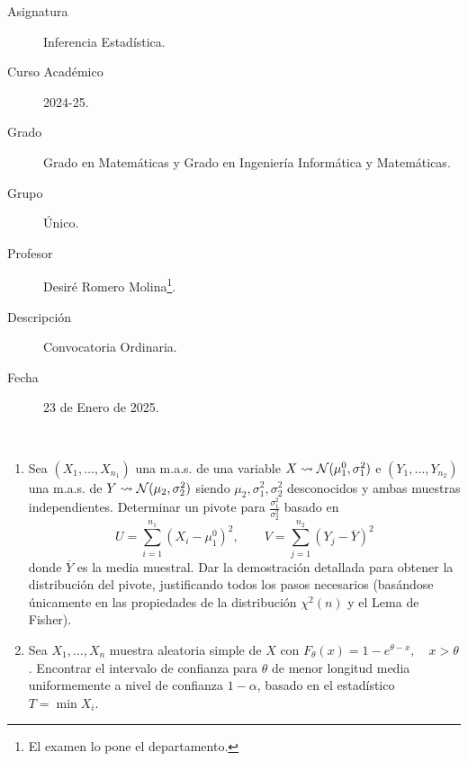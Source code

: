 \documentclass[12pt]{article}
\begin{document}

    
    

    \begin{description}
        \item[Asignatura] Inferencia Estadística.
        \item[Curso Académico] 2024-25.
        \item[Grado] Grado en Matemáticas y Grado en Ingeniería Informática y Matemáticas.
        \item[Grupo] Único.
        \item[Profesor] Desiré Romero Molina\footnote{El examen lo pone el departamento.}.
        \item[Descripción] Convocatoria Ordinaria.
        \item[Fecha] 23 de Enero de 2025.  
    \end{description}
    \newpage



    \begin{ejercicio}
        \ \\
        \begin{enumerate}[label=\alph*)]
            \item Sea $(X_1,\ldots,X_{n_1})$ una m.a.s. de una variable $X\rightsquigarrow \mathcal{N}(\mu_1^0,\sigma^2_1)$ e $(Y_1,\ldots,Y_{n_2})$ una m.a.s. de $Y\rightsquigarrow \mathcal{N}(\mu_2,\sigma_2^2)$ siendo $\mu_2,\sigma_1^2,\sigma_2^2$ desconocidos y ambas muestras independientes. Determinar un pivote para $\frac{\sigma_1^2}{\sigma_2^2}$ basado en
                \begin{equation*}
                    U = \sum_{i=1}^{n_1}{(X_i - \mu_1^0)}^{2}, \qquad V = \sum_{j=1}^{n_2}{(Y_j-\overline{Y})}^{2}
                \end{equation*}
                donde $\overline{Y}$ es la media muestral. Dar la demostración detallada para obtener la distribución del pivote, justificando todos los pasos necesarios (basándose únicamente en las propiedades de la distribución $\chi^2(n)$ y el Lema de Fisher).
            \item Sea $X_1,\ldots,X_n$ muestra aleatoria simple de $X$ con $F_\theta(x) = 1-e^{\theta-x},\quad x>\theta$. Encontrar el intervalo de confianza para $\theta$ de menor longitud media uniformemente a nivel de confianza $1-\alpha$, basado en el estadístico $T = \min X_i$.
        \end{enumerate}
    \end{ejercicio}
\end{document}

